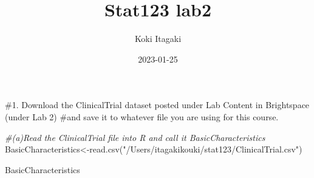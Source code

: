 \documentclass[
]{article}
\title{Stat123 lab2}
\author{Koki Itagaki}
\date{2023-01-25}
\newenvironment{Shaded}{\begin{snugshade}}{\end{snugshade}}
\newcommand{\CommentTok}[1]{\textcolor[rgb]{0.56,0.35,0.01}{\textit{#1}}}
\newcommand{\FunctionTok}[1]{\textcolor[rgb]{0.00,0.00,0.00}{#1}}
\newcommand{\NormalTok}[1]{#1}
\newcommand{\OtherTok}[1]{\textcolor[rgb]{0.56,0.35,0.01}{#1}}
\newcommand{\StringTok}[1]{\textcolor[rgb]{0.31,0.60,0.02}{#1}}
\begin{document}
\maketitle

\#1. Download the ClinicalTrial dataset posted under Lab Content in
Brightspace (under Lab 2) \#and save it to whatever file you are using
for this course.

\begin{Shaded}
\begin{Highlighting}[]
\CommentTok{\#(a)Read the ClinicalTrial file into R and call it BasicCharacteristics}
\NormalTok{BasicCharacteristics}\OtherTok{\textless{}{-}}\FunctionTok{read.csv}\NormalTok{(}\StringTok{"/Users/itagakikouki/stat123/ClinicalTrial.csv"}\NormalTok{)}

\NormalTok{BasicCharacteristics}
\end{Highlighting}
\end{Shaded}
\end{document}
